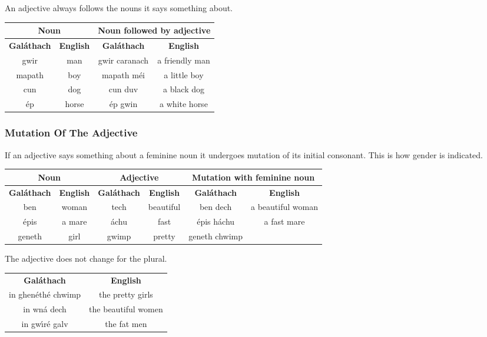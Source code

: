 An adjective always follows the nouns it says something about.
\begin{table}[H]
\centering
\begin{tabular}{cccc}
  \toprule
  \multicolumn{2}{c}{\textbf{Noun}} & \multicolumn{2}{c}{\textbf{Noun followed by adjective}}\\
  \midrule
  \textbf{Gal\'{a}thach} & \textbf{English} & \textbf{Gal\'{a}thach} & \textbf{English}\\
  \cmidrule(lr){1-1}\cmidrule(lr){2-2}\cmidrule(lr){3-3}\cmidrule(lr){4-4}
  gwir & man & gwir caranach & a friendly man\\
  mapath & boy & mapath m\'{e}i & a little boy\\
  cun & dog & cun duv & a black dog\\
  \'{e}p & horse & \'{e}p gwin & a white horse\\
  \bottomrule
\end{tabular}
\label{examples_adjective_order}
\end{table}

\subsubsection{Mutation Of The Adjective}

If an adjective says something about a feminine noun it undergoes mutation of its initial consonant. This is how gender is indicated.
\begin{table}[H]
\centering
\begin{tabular}{cccccc}
  \toprule
  \multicolumn{2}{c}{\textbf{Noun}} & \multicolumn{2}{c}{\textbf{Adjective}} & \multicolumn{2}{c}{\textbf{Mutation with feminine noun}}\\
  \midrule
  \textbf{Gal\'{a}thach} & \textbf{English} & \textbf{Gal\'{a}thach} & \textbf{English} & \textbf{Gal\'{a}thach} & \textbf{English}\\
  \cmidrule(lr){1-1}\cmidrule(lr){2-2}\cmidrule(lr){3-3}\cmidrule(lr){4-4}\cmidrule(lr){5-5}\cmidrule(lr){6-6}
  ben & woman & tech & beautiful & ben dech & a beautiful woman\\
  \'{e}pis & a mare & \'{a}chu & fast & \'{e}pis h\'{a}chu & a fast mare\\
  geneth & girl & gwimp & pretty & geneth chwimp\\
  \bottomrule
\end{tabular}
\label{examples_adjective_order}
\end{table}

The adjective does not change for the plural.
\begin{table}[H]
\centering
\begin{tabular}{cc}
  \toprule
  \textbf{Gal\'{a}thach} & \textbf{English}\\
  \cmidrule(lr){1-1}\cmidrule(lr){2-2}
  in ghen\'{e}th\'{e} chwimp & the pretty girls\\
  in wn\'{a} dech & the beautiful women\\
  in gw\'{\i}r\'{e} galv & the fat men\\
  \bottomrule
\end{tabular}
\label{examples_no_mutation_for_plural}
\end{table}

